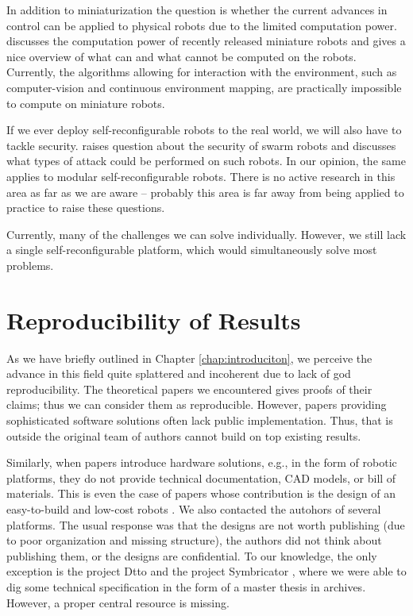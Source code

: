 In addition to miniaturization the question is whether the current advances in
control can be applied to physical robots due to the limited computation power.
\textcite{DBLP:journals/ral/Trenkwalder19} discusses the computation power of
recently released miniature robots and gives a nice overview of what can and
what cannot be computed on the robots. Currently, the algorithms allowing for
interaction with the environment, such as computer-vision and continuous
environment mapping, are practically impossible to compute on miniature robots.

If we ever deploy self-reconfigurable robots to the real world, we will also
have to tackle security. \textcite{DBLP:conf/icas/HigginsTM09} raises question
about the security of swarm robots and discusses what types of attack could be
performed on such robots. In our opinion, the same applies to modular
self-reconfigurable robots. There is no active research in this area as far as
we are aware -- probably this area is far away from being applied to practice to
raise these questions.

Currently, many of the challenges we can solve individually. However, we still
lack a single  self-reconfigurable platform, which would
simultaneously solve most problems.

\section{Reproducibility of Results}\label{sec:reproducibility}

As we have briefly outlined in Chapter \ref{chap:introduciton}, we perceive the
advance in this field quite splattered and incoherent due to lack of god
reproducibility. The theoretical papers we encountered gives proofs of their
claims; thus we can consider them as reproducible. However, papers providing
sophisticated software solutions often lack public implementation. Thus, that
is outside the original team of authors cannot build on top existing results.

Similarly, when papers introduce hardware solutions, e.g., in the form of
robotic platforms, they do not provide technical documentation, CAD models, or
bill of materials. This is even the case of papers whose contribution is the
design of an easy-to-build and low-cost robots \cite{DBLP:conf/robio/YuLW17}. We
also contacted the autohors of several platforms. The usual response was that
the designs are not worth publishing (due to poor organization and missing
structure), the authors did not think about publishing them, or the designs are
confidential. To our knowledge, the only exception is the project Dtto
\cite{otrebla333} and the project Symbricator
\cite{DBLP:journals/corr/abs-1109-2288}, where we were able to dig some
technical specification in the form of a master thesis in archives. However,
a proper central resource is missing.
